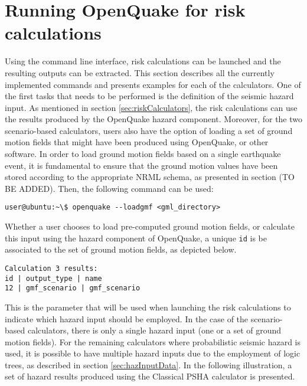 \section{Running OpenQuake for risk calculations}
Using the command line interface, risk calculations can be launched and the resulting outputs can be extracted. This section describes all the currently implemented commands and presents examples for each of the calculators.   
One of the first tasks that needs to be performed is the definition of the seismic hazard input. As mentioned in section \ref{sec:riskCalculators}, the risk calculations can use the results produced by the OpenQuake hazard component. Moreover, for the two scenario-based calculators, users also have the option of loading a set of ground motion fields that might have been produced using OpenQuake, or other software. 
In order to load ground motion fields based on a single earthquake event, it is fundamental to ensure that the ground motion values have been stored according to the appropriate NRML schema, as presented in section (TO BE ADDED). Then, the following command can be used:

\begin{Verbatim}[frame=single, commandchars=\\\{\}, samepage=true]
user@ubuntu:~\$ openquake --loadgmf <gml_directory>
\end{Verbatim}

Whether a user chooses to load pre-computed ground motion fields, or calculate this input using the hazard component of OpenQuake, a unique \verb+id+ is be associated to the set of ground motion fields, as depicted below. 

\begin{Verbatim}[frame=single, commandchars=\\\{\}, samepage=true]
Calculation 3 results:
id | output_type | name
12 | gmf_scenario | gmf_scenario
\end{Verbatim}

This is the parameter that will be used when launching the risk calculations to indicate which hazard input should be employed. In the case of the scenario-based calculators, there is only a single hazard input (one or a set of ground motion fields). For the remaining calculators where probabilistic seismic hazard is used, it is possible to have multiple hazard inputs due to the employment of logic trees, as described in section \ref{sec:hazInputData}. In the following illustration, a set of hazard results produced using the Classical PSHA calculator is presented.

